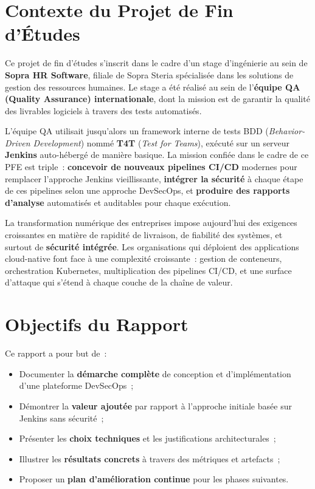\section*{Contexte du Projet de Fin d'Études}

Ce projet de fin d'études s'inscrit dans le cadre d'un stage d'ingénierie au sein de
\textbf{Sopra HR Software}, filiale de Sopra Steria spécialisée dans les solutions de
gestion des ressources humaines. Le stage a été réalisé au sein de l'\textbf{équipe QA
(Quality Assurance) internationale}, dont la mission est de garantir la qualité des
livrables logiciels à travers des tests automatisés.

L'équipe QA utilisait jusqu'alors un framework interne de tests BDD (\textit{Behavior-Driven
Development}) nommé \textbf{T4T} (\textit{Test for Teams}), exécuté sur un serveur
\textbf{Jenkins} auto-hébergé de manière basique. La mission confiée dans le cadre de ce
PFE est triple~: \textbf{concevoir de nouveaux pipelines CI/CD} modernes pour remplacer
l'approche Jenkins vieillissante, \textbf{intégrer la sécurité} à chaque étape de ces
pipelines selon une approche DevSecOps, et \textbf{produire des rapports d'analyse}
automatisés et auditables pour chaque exécution.

La transformation numérique des entreprises impose aujourd'hui des exigences croissantes en
matière de rapidité de livraison, de fiabilité des systèmes, et surtout de \textbf{sécurité
intégrée}. Les organisations qui déploient des applications cloud-native font face à une
complexité croissante~: gestion de conteneurs, orchestration Kubernetes, multiplication des
pipelines CI/CD, et une surface d'attaque qui s'étend à chaque couche de la chaîne de valeur.

\section*{Objectifs du Rapport}

Ce rapport a pour but de~:
\begin{itemize}
  \item Documenter la \textbf{démarche complète} de conception et d'implémentation d'une
        plateforme DevSecOps~;
  \item Démontrer la \textbf{valeur ajoutée} par rapport à l'approche initiale basée sur
        Jenkins sans sécurité~;
  \item Présenter les \textbf{choix techniques} et les justifications architecturales~;
  \item Illustrer les \textbf{résultats concrets} à travers des métriques et artefacts~;
  \item Proposer un \textbf{plan d'amélioration continue} pour les phases suivantes.
\end{itemize}

